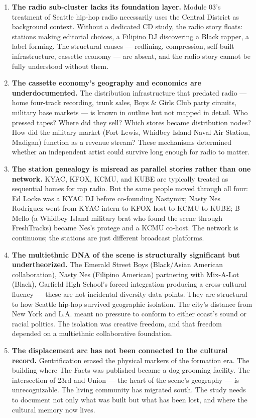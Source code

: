\documentclass[11pt,letterpaper]{article}
\begin{document}
\begin{enumerate}
  \item \textbf{The radio sub-cluster lacks its foundation layer.} Module 03's treatment of Seattle hip-hop radio necessarily uses the Central District as background context. Without a dedicated CD study, the radio story floats: stations making editorial choices, a Filipino DJ discovering a Black rapper, a label forming. The structural causes --- redlining, compression, self-built infrastructure, cassette economy --- are absent, and the radio story cannot be fully understood without them.

  \item \textbf{The cassette economy's geography and economics are underdocumented.} The distribution infrastructure that predated radio --- home four-track recording, trunk sales, Boys \& Girls Club party circuits, military base markets --- is known in outline but not mapped in detail. Who pressed tapes? Where did they sell? Which stores became distribution nodes? How did the military market (Fort Lewis, Whidbey Island Naval Air Station, Madigan) function as a revenue stream? These mechanisms determined whether an independent artist could survive long enough for radio to matter.

  \item \textbf{The station genealogy is misread as parallel stories rather than one network.} KYAC, KFOX, KCMU, and KUBE are typically treated as sequential homes for rap radio. But the same people moved through all four: Ed Locke was a KYAC DJ before co-founding Nastymix; Nasty Nes Rodriguez went from KYAC intern to KFOX host to KCMU to KUBE; B-Mello (a Whidbey Island military brat who found the scene through FreshTracks) became Nes's protege and a KCMU co-host. The network is continuous; the stations are just different broadcast platforms.

  \item \textbf{The multiethnic DNA of the scene is structurally significant but undertheorized.} The Emerald Street Boys (Black/Asian American collaboration), Nasty Nes (Filipino American) partnering with Mix-A-Lot (Black), Garfield High School's forced integration producing a cross-cultural fluency --- these are not incidental diversity data points. They are structural to how Seattle hip-hop survived geographic isolation. The city's distance from New York and L.A. meant no pressure to conform to either coast's sound or racial politics. The isolation was creative freedom, and that freedom depended on a multiethnic collaborative foundation.

  \item \textbf{The displacement arc has not been connected to the cultural record.} Gentrification erased the physical markers of the formation era. The building where The Facts was published became a dog grooming facility. The intersection of 23rd and Union --- the heart of the scene's geography --- is unrecognizable. The living community has migrated south. The study needs to document not only what was built but what has been lost, and where the cultural memory now lives.
\end{enumerate}
\end{document}
